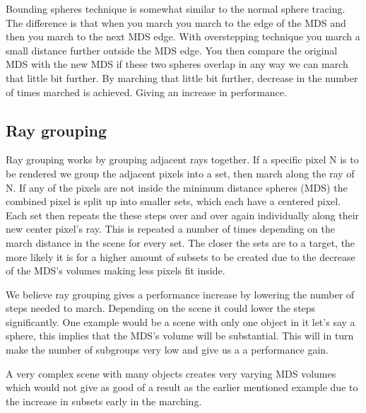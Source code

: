 			Bounding spheres technique is somewhat similar to the normal sphere
			tracing. The difference is that when you march you march to the
			edge of the MDS and then you march to the next MDS edge. With
			overstepping technique you march a small distance further
			outside the MDS edge. You then compare the original MDS with the
			new MDS if these two spheres overlap in any way we can march that
			little bit further. By marching that little bit further, decrease
			in the number of times marched is achieved. Giving an increase in
			performance. 
			
		\subsection{Ray grouping}
		
			Ray grouping works by grouping adjacent rays together.  If a specific
			pixel N is to be rendered we group the adjacent pixels into a set, then
			march along the ray of N. If any of the pixels are not inside the minimum
			distance spheres (MDS) the combined pixel is split up into smaller sets,
			which each have a centered pixel. Each set then repeats the these steps
			over and over again individually along their new center pixel's ray.
			This is repeated a number of times depending on the march distance in the
			scene for every set. The closer the sets are to a target, the more likely
			it is for a higher amount of subsets to be created due to the decrease of
			the MDS's volumes making less pixels fit inside.
			
			We believe ray grouping gives a performance increase by lowering the
			number of steps needed to march. Depending on the scene it could lower
			the steps significantly. One example would be a scene with only one
			object in it let's say a sphere, this implies that the MDS's volume will
			be substantial. This will in turn make the number of subgroups very low
			and give us a a performance gain. 
			
			A very complex scene with many objects creates very varying MDS volumes
			which would not give as good of a result as the earlier mentioned example
			due to the increase in subsets early in the marching.
			
